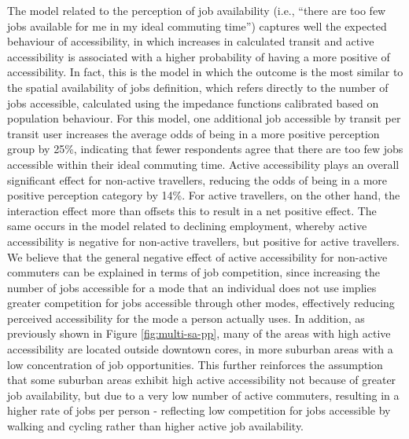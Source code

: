 \documentclass[preprint, 3p,
authoryear]{elsarticle} %
\begin{document}
The model related to the perception of job availability (i.e., ``there
are too few jobs available for me in my ideal commuting time'') captures
well the expected behaviour of accessibility, in which increases in
calculated transit and active accessibility is associated with a higher
probability of having a more positive of accessibility. In fact, this is
the model in which the outcome is the most similar to the spatial
availability of jobs definition, which refers directly to the number of
jobs accessible, calculated using the impedance functions calibrated
based on population behaviour. For this model, one additional job
accessible by transit per transit user increases the average odds of
being in a more positive perception group by 25\%, indicating that fewer
respondents agree that there are too few jobs accessible within their
ideal commuting time. Active accessibility plays an overall significant
effect for non-active travellers, reducing the odds of being in a more
positive perception category by 14\%. For active travellers, on the
other hand, the interaction effect more than offsets this to result in a
net positive effect. The same occurs in the model related to declining
employment, whereby active accessibility is negative for non-active
travellers, but positive for active travellers. We believe that the
general negative effect of active accessibility for non-active commuters
can be explained in terms of job competition, since increasing the
number of jobs accessible for a mode that an individual does not use
implies greater competition for jobs accessible through other modes,
effectively reducing perceived accessibility for the mode a person
actually uses. In addition, as previously shown in Figure
\ref{fig:multi-sa-pp}, many of the areas with high active accessibility
are located outside downtown cores, in more suburban areas with a low
concentration of job opportunities. This further reinforces the
assumption that some suburban areas exhibit high active accessibility
not because of greater job availability, but due to a very low number of
active commuters, resulting in a higher rate of jobs per person -
reflecting low competition for jobs accessible by walking and cycling
rather than higher active job availability.
\end{document}
